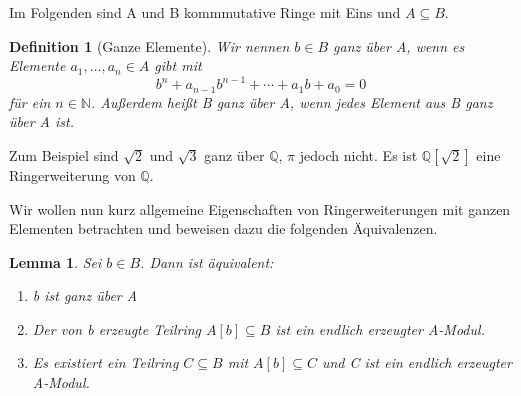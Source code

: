 \documentclass{article}
\newtheorem{definition}[satz]{Definition}
\newtheorem{lemma}[satz]{Lemma}
\begin{document}
	Im Folgenden sind A und B kommmutative Ringe mit Eins und \(A \subseteq B\).

	\begin{definition}[Ganze Elemente]
	Wir nennen \(b \in B\) ganz über A, wenn es Elemente \(a_1, \ldots, a_n \in
	A\) gibt mit
	\begin{displaymath} b^n + a_{n-1}b^{n-1} + \cdots + a_1b + a_0 = 0
	\end{displaymath} für ein \(n \in \mathbb{N}\).
	Außerdem heißt B ganz über A, wenn jedes Element aus B ganz über A ist.
	\end{definition}

	Zum Beispiel sind \(\sqrt{2}\) und \(\sqrt{3}\) ganz über \(\mathbb{Q}\), \(\pi\) jedoch nicht. Es ist \(\mathbb{Q}[\sqrt{2}]\) eine Ringerweiterung von \(\mathbb{Q}\).
	
	Wir wollen nun kurz allgemeine Eigenschaften von Ringerweiterungen mit ganzen
	Elementen betrachten und beweisen dazu die folgenden Äquivalenzen.
		
	\begin{lemma} \label{2.1.1}
	Sei \(b \in B\). Dann ist äquivalent:
	\begin{enumerate}
	\item b ist ganz über A
	\item Der von b erzeugte Teilring \(A[b] \subseteq B\) ist ein endlich
	erzeugter A-Modul.
	\item Es existiert ein Teilring \(C \subseteq B\) mit \(A[b] \subseteq C\)
	und C ist ein endlich erzeugter A-Modul.
	\end{enumerate}
	\end{lemma}
\end{document}
